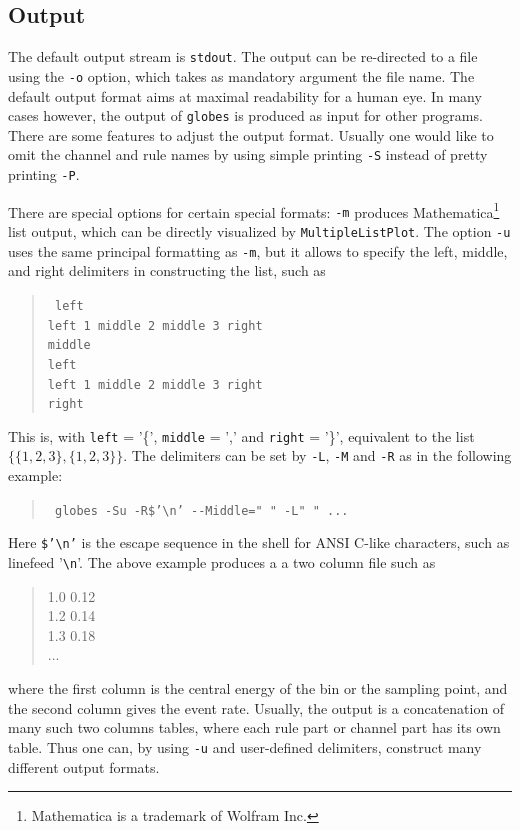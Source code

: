 \subsection*{Output}

The default output stream is {\tt stdout}. The output can be re-directed to 
a file using the {\tt -o} option, which takes as mandatory argument 
the file name. The default output format aims at maximal readability for
a human eye. In many cases however, the output of {\tt globes} is produced
as input for other programs. There are some features to adjust the
output format. Usually one would like to omit the channel and rule 
names by using simple printing {\tt -S} instead of pretty printing {\tt -P}.

There are special options for certain special formats: {\tt -m} produces
Mathematica\footnote{Mathematica is a trademark of Wolfram Inc.} list
output, which can be directly visualized by {\tt MultipleListPlot}.
The option {\tt -u} uses the same principal formatting as {\tt -m}, but
it allows to specify the left, middle, and right delimiters in constructing
the list, such as
\begin{quote}
{\tt
left\\
left 1 middle 2 middle 3 right\\
middle\\
left\\
left 1 middle 2 middle 3 right\\
right\\
}
\end{quote}
This is, with {\tt left} = '\{', {\tt middle} = ',' and {\tt right} = '\}',
equivalent to the list $\{\{1,2,3\},\{1,2,3\}\}$. 
The delimiters can be set by {\tt -L}, {\tt -M} and {\tt -R} as in the 
following example:
\begin{quote}
{\tt
globes -Su -R\$'\verb+\n+' \verb+--+Middle=" " -L" " ...
}
\end{quote}
Here {\tt \$'\verb+\n+'} is the escape sequence in the shell for ANSI C-like characters, such as linefeed '\verb+\n+'. The above example
produces a a two column file such as
\begin{quote}
1.0 0.12\\
1.2 0.14\\
1.3 0.18\\
...
\end{quote}
where the first column is the central energy of the bin or the sampling point,
 and
the second column gives the event rate. Usually, the output is a concatenation of many such two columns tables, where 
each rule part or channel part has its own table. Thus one can, by using
{\tt -u} and user-defined delimiters, construct many different  
output formats.

